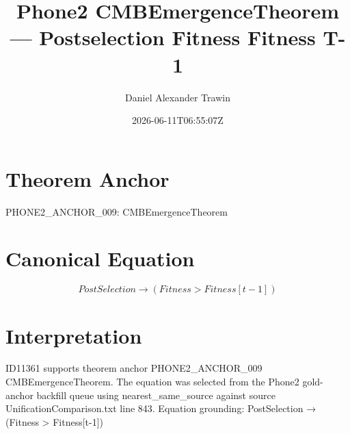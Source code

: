 \documentclass[11pt]{article}
\title{Phone2 CMBEmergenceTheorem — Postselection Fitness Fitness T-1}
\author{Daniel Alexander Trawin}
\date{2026-06-11T06:55:07Z}
\begin{document}
\maketitle
\section*{Theorem Anchor}
PHONE2_ANCHOR_009: CMBEmergenceTheorem
\section*{Canonical Equation}
\[
PostSelection → (Fitness > Fitness[t-1])
\]
\section*{Interpretation}
ID11361 supports theorem anchor PHONE2_ANCHOR_009 CMBEmergenceTheorem. The equation was selected from the Phone2 gold-anchor backfill queue using nearest_same_source against source UnificationComparison.txt line 843. Equation grounding: PostSelection → (Fitness > Fitness[t-1])
\end{document}
